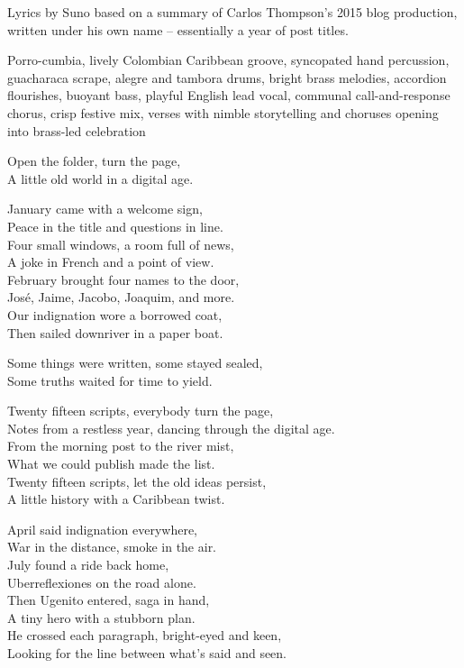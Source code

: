 
\begin{notes}
Lyrics by Suno based on a summary of Carlos Thompson's 2015 blog production, written under his own name -- essentially a year of post titles.
\end{notes}
\begin{style}
Porro-cumbia, lively Colombian Caribbean groove, syncopated hand percussion, guacharaca scrape, alegre and tambora drums, bright brass melodies, accordion flourishes, buoyant bass, playful English lead vocal, communal call-and-response chorus, crisp festive mix, verses with nimble storytelling and choruses opening into brass-led celebration
\end{style}
\begin{lyrics}
Open the folder, turn the page,\\
A little old world in a digital age.

January came with a welcome sign,\\
Peace in the title and questions in line.\\
Four small windows, a room full of news,\\
A joke in French and a point of view.\\
February brought four names to the door,\\
José, Jaime, Jacobo, Joaquim, and more.\\
Our indignation wore a borrowed coat,\\
Then sailed downriver in a paper boat.

Some things were written, some stayed sealed,\\
Some truths waited for time to yield.

Twenty fifteen scripts, everybody turn the page,\\
Notes from a restless year, dancing through the digital age.\\
From the morning post to the river mist,\\
What we could publish made the list.\\
Twenty fifteen scripts, let the old ideas persist,\\
A little history with a Caribbean twist.

April said indignation everywhere,\\
War in the distance, smoke in the air.\\
July found a ride back home,\\
Uberreflexiones on the road alone.\\
Then Ugenito entered, saga in hand,\\
A tiny hero with a stubborn plan.\\
He crossed each paragraph, bright-eyed and keen,\\
Looking for the line between what's said and seen.


\end{lyrics}
